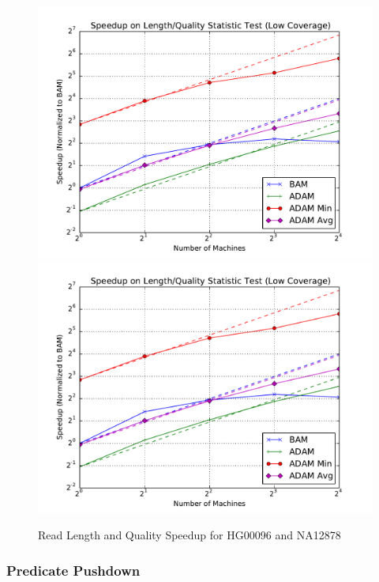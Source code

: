 \documentclass[10pt,twocolumn]{article}
\theoremstyle{plain}
\begin{document}
\begin{figure}[h]
\begin{center}
\includegraphics[width=\linewidth]{microbenchmarks/length_and_quality_low_coverage.pdf}
\includegraphics[width=\linewidth]{microbenchmarks/length_and_quality_low_coverage.pdf}
\end{center}
\caption{Read Length and Quality Speedup for HG00096 and NA12878}
\label{fig:length-quality}
\end{figure}

\subsubsection{Predicate Pushdown}
\label{sec:predicate-pushdown}
\end{document}
